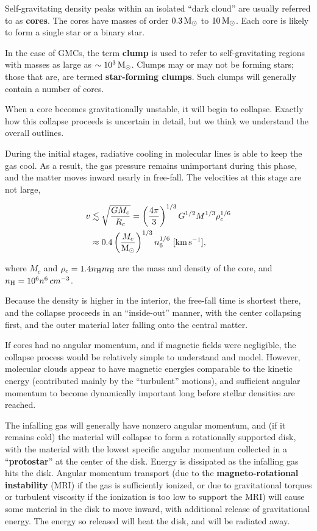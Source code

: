 \documentclass[a4paper,10pt]{article}
\begin{document}
{\noindent}Self-gravitating density peaks within an isolated ``dark cloud'' are usually referred to as \textbf{cores}. The cores have masses of order $0.3\,{\rm M_\odot}$ to $10\,{\rm M_\odot}$. Each core is likely to form a single star or a binary star.

{\noindent}In the case of GMCs, the term \textbf{clump} is used to refer to self-gravitating regions with masses as large as $\sim10^3\,{\rm M_\odot}$. Clumps may or may not be forming stars; those that are, are termed \textbf{star-forming clumps}. Such clumps will generally contain a number of cores.

{\noindent}When a core becomes gravitationally unstable, it will begin to collapse. Exactly how this collapse proceeds is uncertain in detail, but we think we understand the overall outlines.

{\noindent}During the initial stages, radiative cooling in molecular lines is able to keep the gas cool. As a result, the gas pressure remains unimportant during this phase, and the matter moves inward nearly in free-fall. The velocities at this stage are not large,

\begin{align*}
    v &\lesssim \sqrt{\frac{GM_c}{R_c}} = \left(\frac{4\pi}{3}\right)^{1/3} G^{1/2} M^{1/3} \rho_c^{1/6} \\
    &\approx 0.4 \left(\frac{M_c}{{\rm M_\odot}}\right)^{1/3} n_6^{1/6} ~ [{\rm km\,s^{-1}}],
\end{align*}

{\noindent}where $M_c$ and $\rho_c=1.4n_{\rm H}m_{\rm H}$ are the mass and density of the core, and $n_{\rm H}=10^6n^6\,{cm^{-3}}$.

{\noindent}Because the density is higher in the interior, the free-fall time is shortest there, and the collapse proceeds in an ``inside-out'' manner, with the center collapsing first, and the outer material later falling onto the central matter.

{\noindent}If cores had no angular momentum, and if magnetic fields were negligible, the collapse process would be relatively simple to understand and model. However, molecular clouds appear to have magnetic energies comparable to the kinetic energy (contributed mainly by the ``turbulent'' motions), and sufficient angular momentum to become dynamically important long
before stellar densities are reached. 

{\noindent}The infalling gas will generally have nonzero angular momentum, and (if it remains cold) the material will collapse to form a rotationally supported disk, with the material with the lowest specific angular momentum collected in a ``\textbf{protostar}'' at the center of the disk. Energy is dissipated as the infalling gas hits the disk. Angular momentum transport (due to the \textbf{magneto-rotational instability} (MRI) if the gas is sufficiently ionized, or due to gravitational torques or turbulent viscosity if the ionization is too low to support the MRI) will cause some material in the disk to move inward, with additional release of gravitational energy. The energy so released will heat the disk, and will be radiated away.
\end{document}
